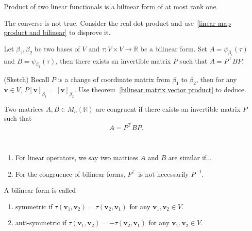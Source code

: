 \begin{corollary}
    Product of two linear functionals is a bilinear form of at most rank one.
\end{corollary}

\begin{remark}
    The converse is not true. Consider the real dot product and use~\eqref{linear map product and bilinear} to disprove it. 
\end{remark}


\begin{theorem}[Congruence]
    Let $\beta_1, \beta_2$ be two bases of $V$ and $\tau: V\times V\to \mathbb{R}$ be a bilinear form.
    Set $A=\psi_{\beta_1}(\tau)$ and $B=\psi_{\beta_2}(\tau)$, then there exists an invertible matrix $P$ such that $A=P^\top BP.$ 
\end{theorem}

\begin{pfbox}
    (Sketch) Recall $P$ is a change of coordinate matrix from $\beta_1$ to $\beta_2$, then for any $\mathbf{v}\in V$, $P[\mathbf{v}]_{\beta_1} = [\mathbf{v}]_{\beta_2}.$
    Use theorem~\eqref{bilinear matrix vector product} to deduce.
\end{pfbox}


\begin{definition}
Two matrices $A,B\in M_n(\mathbb{R})$ are congruent if there exists an invertible matrix $P$ such that
\[
A=P^\top BP.
\]
\label{congruence}
\end{definition}

\begin{remark}\ \vspace{-1em}
    \begin{enumerate}
        \item For linear operators, we say two matrices $A$ and $B$ are similar if...
        \item For the congruence of bilinear forms, $P^\top$ is not necessarily $P^{-1}.$ 
    \end{enumerate}
\end{remark}

\begin{definition}
    A bilinear form is called
    \begin{enumerate}
        \item symmetric if $\tau(\mathbf{v}_1,\mathbf{v}_2)=\tau(\mathbf{v}_2,\mathbf{v}_1)$ for any $\mathbf{v}_1,\mathbf{v}_2\in V$.
        \item anti-symmetric if $\tau(\mathbf{v}_1,\mathbf{v}_2)=-\tau(\mathbf{v}_2,\mathbf{v}_1)$ for any $\mathbf{v}_1,\mathbf{v}_2\in V$.
    \end{enumerate}
\end{definition}

